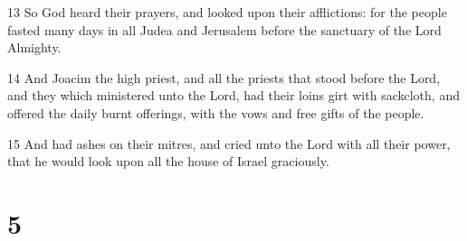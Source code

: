 \par 13 So God heard their prayers, and looked upon their afflictions: for the people fasted many days in all Judea and Jerusalem before the sanctuary of the Lord Almighty.
\par 14 And Joacim the high priest, and all the priests that stood before the Lord, and they which ministered unto the Lord, had their loins girt with sackcloth, and offered the daily burnt offerings, with the vows and free gifts of the people.
\par 15 And had ashes on their mitres, and cried unto the Lord with all their power, that he would look upon all the house of Israel graciously.

\chapter{5}


